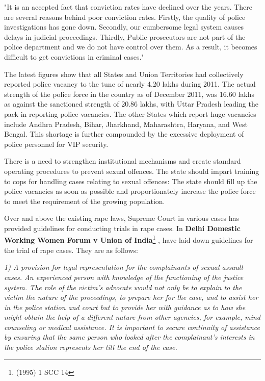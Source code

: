 \begin{multicols}{2}

\noi
"It is an accepted fact that conviction rates have declined over the years. There are
several reasons behind poor conviction rates. Firstly, the quality of police investigations
has gone down. Secondly, our cumbersome legal system causes delays in judicial
proceedings. Thirdly, Public prosecutors are not part of the police department and we
do not have control over them. As a result, it becomes difficult to get convictions in
criminal cases."

\noi
The latest figures show that all States and Union Territories had collectively reported
police vacancy to the tune of nearly 4.20 lakhs during 2011. The actual strength of the
police force in the country as of December 2011, was 16.60 lakhs as against the sanctioned strength of 20.86 lakhs, with Uttar Pradesh leading the pack in reporting
police vacancies. The other States which report huge vacancies include Andhra
Pradesh, Bihar, Jharkhand, Maharashtra, Haryana, and West Bengal. This shortage is
further compounded by the excessive deployment of police personnel for VIP security.

\noi
There is a need to strengthen institutional mechanisms and create standard operating
procedures to prevent sexual offences. The state should impart training to cops for
handling cases relating to sexual offences: The state should fill up the police vacancies
as soon as possible and proportionately increase the police force to meet the
requirement of the growing population.


\noi
Over and above the existing rape laws, Supreme Court in various cases has provided
guidelines for conducting trials in rape cases. In \textbf{Delhi Domestic Working Women
Forum v Union of India}\footnote{ (1995) 1 SCC 14}
, have laid down guidelines for the trial of rape cases. They
are as follows: 

\noi
\textit{1) A provision for legal representation for the complainants of sexual assault
cases. An experienced person with knowledge of the functioning of the justice system.
The role of the victim's advocate would not only be to explain to the victim the nature
of the proceedings, to prepare her for the case, and to assist her in the police station
and court but to provide her with guidance as to how she might obtain the help of a
different nature from other agencies, for example, mind counseling or medical
assistance. It is important to secure continuity of assistance by ensuring that the same
person who looked after the complainant's interests in the police station represents her
till the end of the case.}


\end{multicols}
